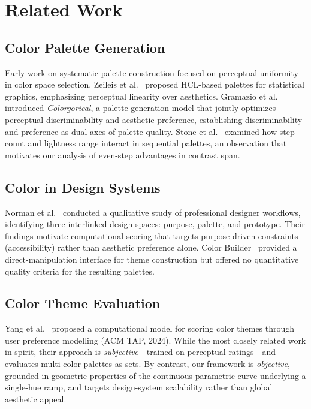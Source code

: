 \section{Related Work}

\subsection{Color Palette Generation}

Early work on systematic palette construction focused on perceptual
uniformity in color space selection. Zeileis et al.~\cite{zeileis2009}
proposed HCL-based palettes for statistical graphics, emphasizing
perceptual linearity over aesthetics. Gramazio et al.~\cite{gramazio2017}
introduced \emph{Colorgorical}, a palette generation model that jointly
optimizes perceptual discriminability and aesthetic preference, establishing
discriminability and preference as dual axes of palette quality.
Stone et al.~\cite{stone2014} examined how step count and lightness range
interact in sequential palettes, an observation that motivates our
analysis of even-step advantages in contrast span.

\subsection{Color in Design Systems}

Norman et al.~\cite{norman2024} conducted a qualitative study of
professional designer workflows, identifying three interlinked design spaces:
purpose, palette, and prototype. Their findings motivate computational
scoring that targets purpose-driven constraints (accessibility) rather than
aesthetic preference alone. Color Builder~\cite{colorbuilder2019} provided
a direct-manipulation interface for theme construction but offered no
quantitative quality criteria for the resulting palettes.

\subsection{Color Theme Evaluation}

Yang et al.~\cite{yang2024} proposed a computational model for scoring
color themes through user preference modelling (ACM TAP, 2024).
While the most closely related work in spirit, their approach is
\emph{subjective}—trained on perceptual ratings—and evaluates
multi-color palettes as sets. By contrast, our framework is
\emph{objective}, grounded in geometric properties of the continuous
parametric curve underlying a single-hue ramp, and targets design-system
scalability rather than global aesthetic appeal.

